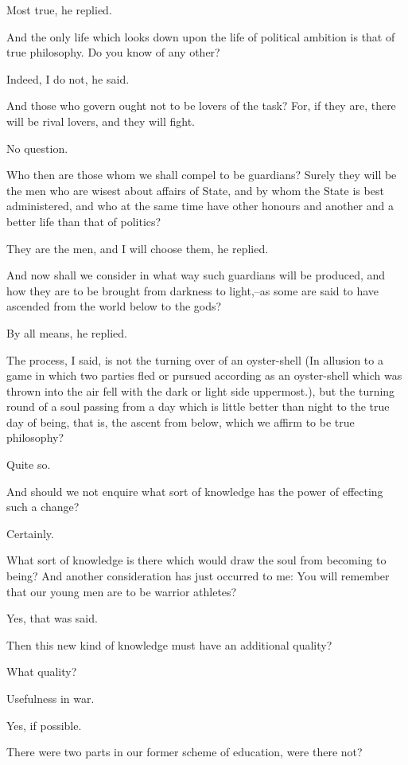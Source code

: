 Most true, he replied.

And the only life which looks down upon the life of political ambition
is that of true philosophy. Do you know of any other?

Indeed, I do not, he said.

And those who govern ought not to be lovers of the task? For, if they
are, there will be rival lovers, and they will fight.

No question.

Who then are those whom we shall compel to be guardians? Surely they
will be the men who are wisest about affairs of State, and by whom the
State is best administered, and who at the same time have other honours
and another and a better life than that of politics?

They are the men, and I will choose them, he replied.

And now shall we consider in what way such guardians will be produced,
and how they are to be brought from darkness to light,--as some are said
to have ascended from the world below to the gods?

By all means, he replied.

The process, I said, is not the turning over of an oyster-shell (In
allusion to a game in which two parties fled or pursued according as an
oyster-shell which was thrown into the air fell with the dark or light
side uppermost.), but the turning round of a soul passing from a day
which is little better than night to the true day of being, that is, the
ascent from below, which we affirm to be true philosophy?

Quite so.

And should we not enquire what sort of knowledge has the power of
effecting such a change?

Certainly.

What sort of knowledge is there which would draw the soul from becoming
to being? And another consideration has just occurred to me: You will
remember that our young men are to be warrior athletes?

Yes, that was said.

Then this new kind of knowledge must have an additional quality?

What quality?

Usefulness in war.

Yes, if possible.

There were two parts in our former scheme of education, were there not?

